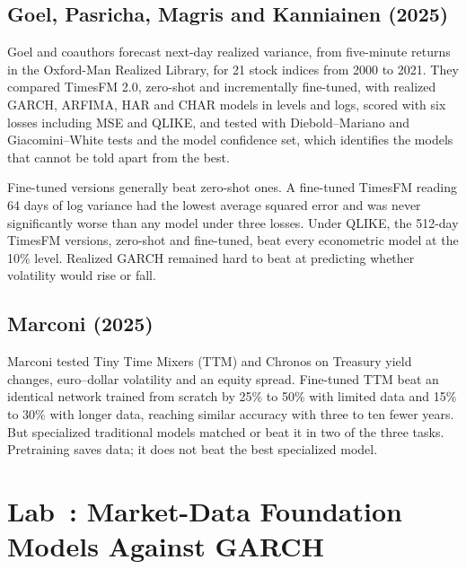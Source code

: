 \subsection{Goel, Pasricha, Magris and Kanniainen (2025)}

Goel and coauthors forecast next-day realized variance, from five-minute returns in the Oxford-Man Realized Library, for 21 stock indices from 2000 to 2021. They compared TimesFM 2.0, zero-shot and incrementally fine-tuned, with realized GARCH, ARFIMA, HAR and CHAR models in levels and logs, scored with six losses including MSE and QLIKE, and tested with Diebold--Mariano and Giacomini--White tests and the model confidence set, which identifies the models that cannot be told apart from the best.

Fine-tuned versions generally beat zero-shot ones. A fine-tuned TimesFM reading 64 days of log variance had the lowest average squared error and was never significantly worse than any model under three losses. Under QLIKE, the 512-day TimesFM versions, zero-shot and fine-tuned, beat every econometric model at the 10\% level. Realized GARCH remained hard to beat at predicting whether volatility would rise or fall.

\subsection{Marconi (2025)}

Marconi tested Tiny Time Mixers (TTM) and Chronos on Treasury yield changes, euro--dollar volatility and an equity spread. Fine-tuned TTM beat an identical network trained from scratch by 25\% to 50\% with limited data and 15\% to 30\% with longer data, reaching similar accuracy with three to ten fewer years. But specialized traditional models matched or beat it in two of the three tasks. Pretraining saves data; it does not beat the best specialized model.

\section{Lab~\thechapter: Market-Data Foundation Models Against GARCH}
\label{sec:23-lab}

